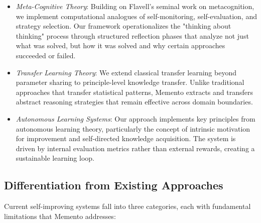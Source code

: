 \documentclass[10pt,a4paper,twocolumn]{article}
\begin{document}
\begin{itemize}
    \item \textit{Meta-Cognitive Theory}: Building on Flavell's seminal work on metacognition, we implement computational analogues of self-monitoring, self-evaluation, and strategy selection. Our framework operationalizes the "thinking about thinking" process through structured reflection phases that analyze not just what was solved, but how it was solved and why certain approaches succeeded or failed.

\item \textit{Transfer Learning Theory}: We extend classical transfer learning beyond parameter sharing to principle-level knowledge transfer. Unlike traditional approaches that transfer statistical patterns, Memento extracts and transfers abstract reasoning strategies that remain effective across domain boundaries.

\item \textit{Autonomous Learning Systems}: Our approach implements key principles from autonomous learning theory, particularly the concept of intrinsic motivation for improvement and self-directed knowledge acquisition. The system is driven by internal evaluation metrics rather than external rewards, creating a sustainable learning loop.
\end{itemize}

\subsection{Differentiation from Existing Approaches}

Current self-improving systems fall into three categories, each with fundamental limitations that Memento addresses:
\end{document}
